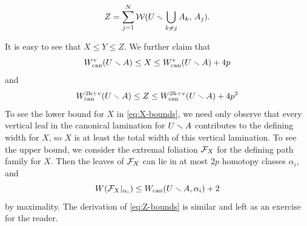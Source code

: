 $$
   Z = \sum_{j=1}^N  {\mathcal W} ( U \smallsetminus \bigcup_{k \not= j } A_k ,\, A_j ).
$$

It is easy to see that $X\leq Y\leq Z$.
We further claim that
\begin{equation} \label{eq:X-bounds}
W_{\operatorname{can}}^{\mathrm{v}}(U \smallsetminus A) \le X \le W_{\operatorname{can}}^{\mathrm{v}}(U \smallsetminus A) + 4p
\end{equation}
and
\begin{equation} \label{eq:Z-bounds}
W_{\operatorname{can}}^{2{\mathrm{h}} + {\mathrm{v}}}(U \smallsetminus A) \le Z \le  W_{\operatorname{can}}^{2{\mathrm{h}} + {\mathrm{v}}}(U \smallsetminus A) + 4p^2
\end{equation}
To see the lower bound for $X$ in \eqref{eq:X-bounds},
we need only observe that every vertical leaf in the canonical lamination for $U \smallsetminus A$ contributes to the defining width for $X$,
so $X$ is at least the total width of this vertical lamination.
To see the upper bound,
we consider the extremal foliation ${\mathcal F}_X$ for the defining path family for $X$.
Then the leaves of ${\mathcal F}_X$ can lie in at most $2p$ homotopy classes $\alpha_i$,
and 
$$
W({\mathcal F}_X|_{\alpha_i}) \le W_{\operatorname{can}}(U \smallsetminus A,\alpha_i) + 2
$$
by maximality. 
The derivation of \eqref{eq:Z-bounds} is similar and left as an exercise for the reader. 

